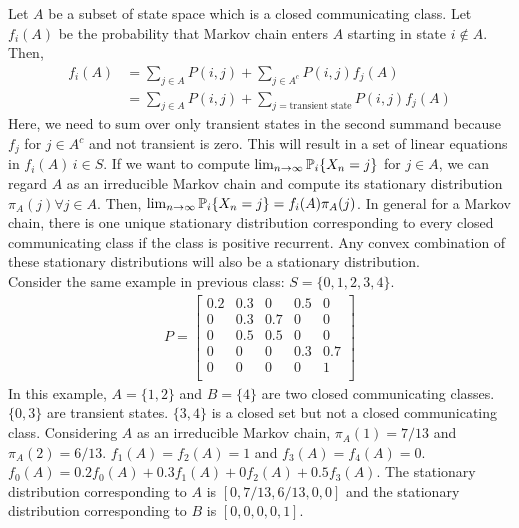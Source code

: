 \documentclass[all-lectures.tex]{subfiles}
\begin{document}
Let $A$ be a subset of state space which is a closed communicating class. Let $f_i(A)$ be the probability that Markov chain enters $A$ starting in state $i\notin A$. Then, 
\begin{align*}
f_i(A) &= \sum_{j\in A} P(i,j) + \sum_{j\in A^c} P(i,j) f_j(A) \\
&= \sum_{j\in A} P(i,j) + \sum_{j = \text{transient state}} P(i,j) f_j(A)
\end{align*}
Here, we need to sum over only transient states in the second summand because $f_j$ for $j \in A^c$ and not transient is zero. This will result in a set of linear equations in $f_i(A)\, i\in S$. If we want to compute $\lim_{n\rightarrow \infty}\P_i\{X_n = j\}$ for $j \in A$, we can regard $A$ as an irreducible Markov chain and compute its stationary distribution $\pi_A(j) \forall j \in A$. Then, $\lim_{n\rightarrow \infty}\P_i\{X_n = j\} = f_i(A) \pi_A(j)$. 
In general for a Markov chain, there is one unique stationary distribution corresponding to every closed communicating class if the class is positive recurrent. Any convex combination of these stationary distributions will also be a stationary distribution. \\
\indent Consider the same example in previous class: $S = \{0,1,2,3,4\}$.
\begin{align*}
	P = 
\begin{bmatrix}
	0.2      & 0.3 & 0 & 0.5 & 0  \\
    0      & 0.3 & 0.7 & 0 & 0 \\
	0      & 0.5 & 0.5 & 0 & 0  \\
   0      & 0 & 0 & 0.3 & 0.7  \\
    0      & 0 & 0 & 0 & 1 \\
\end{bmatrix}
\end{align*}
In this example, $A=\{1,2\}$ and $B= \{4\}$ are two closed communicating classes. $\{0,3\}$  are transient states. $\{3,4\}$ is a closed set but not a closed communicating class. Considering $A$ as an irreducible Markov chain, $\pi_A(1) = 7/13$ and $\pi_A(2) = 6/13$. $f_1(A) = f_2(A) = 1$ and $f_3(A) = f_4(A) = 0$. $f_0(A) = 0.2 f_0(A) + 0.3 f_1(A) + 0 f_2(A) + 0.5 f_3(A)$. The stationary distribution corresponding to $A$ is $[0, 7/13, 6/13, 0, 0]$ and the stationary distribution corresponding to $B$ is $[0, 0, 0, 0, 1]$.
\end{document}
